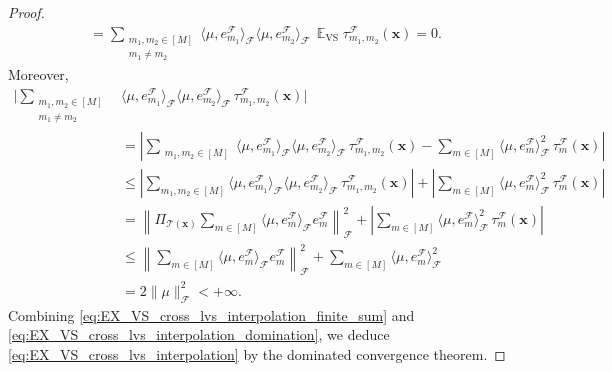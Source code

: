 \documentclass[twoside,11pt]{book}
\numberwithin{theorem}{chapter}
\numberwithin{definition}{chapter}
\numberwithin{proposition}{chapter}
\numberwithin{corollary}{chapter}
\numberwithin{example}{chapter}
\numberwithin{lemma}{chapter}
\DeclareMathOperator{\VS}{\mathrm{VS}}
\DeclareMathOperator{\EX}{\mathbb{E}}
\DeclareMathOperator{\F}{\mathcal{F}}
\begin{document}
\begin{proof}
\begin{align}
& =  \sum\limits_{\substack{m_{1},m_{2} \in [M] \\ m_{1} \neq m_{2}}}  \langle \mu, e_{m_{1}}^{\F} \rangle_{\F} \langle \mu, e_{m_{2}}^{\F} \rangle_{\F} \,\EX_{\VS} \tau_{m_{1},m_{2}}^{\F}(\bm{x}) = 0.
\label{eq:EX_VS_cross_lvs_interpolation_finite_sum}
\end{align}
Moreover,
\begin{align}
\Bigg\vert\sum\limits_{\substack{m_{1},m_{2} \in [M] \\ m_{1} \neq m_{2}}}  &\langle \mu, e_{m_{1}}^{\F} \rangle_{\F} \langle \mu, e_{m_{2}}^{\F} \rangle_{\F} \,\tau_{m_{1},m_{2}}^{\F}(\bm{x})\Bigg\vert\nonumber \\
& = \left|\sum\limits_{\substack{m_{1},m_{2} \in [M]}}  \langle \mu, e_{m_{1}}^{\F} \rangle_{\F} \langle \mu, e_{m_{2}}^{\F} \rangle_{\F} \,\tau_{m_{1},m_{2}}^{\F}(\bm{x}) - \sum\limits_{m \in [M]} \langle \mu, e_{m}^{\F} \rangle_{\F}^{2} \,\tau_{m}^{\F}(\bm{x})\right|  \nonumber\\
 & \leq \left|\sum\limits_{m_{1},m_{2} \in [M]}  \langle \mu, e_{m_{1}}^{\F} \rangle_{\F} \langle \mu, e_{m_{2}}^{\F} \rangle_{\F} \,\tau_{m_{1},m_{2}}^{\F}(\bm{x})\right|
 +  \left|\sum\limits_{m \in [M]} \langle \mu, e_{m}^{\F} \rangle_{\F}^{2} \,\tau_{m}^{\F}(\bm{x})\right| \nonumber\\
& = \left\| \Pi_{\mathcal{T}(\bm{x})} \sum\limits_{m \in [M]} \langle \mu, e_{m}^{\F} \rangle_{\F} e_{m}^{\F}\right\|_{\F}^{2}  +  \left|\sum\limits_{m \in [M]} \langle \mu, e_{m}^{\F} \rangle_{\F}^{2} \,\tau_{m}^{\F}(\bm{x})\right| \nonumber\\
& \leq \left\|\sum\limits_{m \in [M]} \langle \mu, e_{m}^{\F} \rangle_{\F} e_{m}^{\F}\right\|_{\F}^{2}  +  \sum\limits_{m \in [M]} \langle \mu, e_{m}^{\F} \rangle_{\F}^{2} \nonumber \\
& = 2 \|\mu\|_{\F}^{2} < +\infty.
\label{eq:EX_VS_cross_lvs_interpolation_domination}
\end{align}
Combining \eqref{eq:EX_VS_cross_lvs_interpolation_finite_sum} and \eqref{eq:EX_VS_cross_lvs_interpolation_domination}, we deduce \eqref{eq:EX_VS_cross_lvs_interpolation} by the dominated convergence theorem.


\end{proof}
\end{document}
